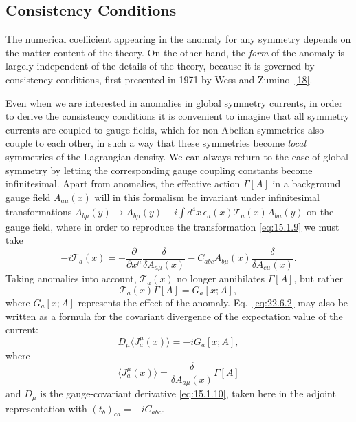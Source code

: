 \subsection{Consistency Conditions}
\label{sec:22.6}

The numerical coefficient appearing in the anomaly for any symmetry
depends on the matter content of the theory. On the other hand, the
\emph{form} of the anomaly is largely independent of the details of the
theory, because it is governed by consistency conditions, first presented
in 1971 by Wess and Zumino~\hyperref[ch22-ref-18]{[18]}.

Even when we are interested in anomalies in global symmetry currents, in
order to derive the consistency conditions it is convenient to imagine
that all symmetry currents are coupled to gauge fields, which for
non-Abelian symmetries also couple to each other, in such a way that these
symmetries become \emph{local} symmetries of the Lagrangian density. We can
always return to the case of global symmetry by letting the corresponding
gauge coupling constants become infinitesimal. Apart from anomalies, the
effective action $\Gamma[A]$ in a background gauge field
$A_{a\mu}(x)$ will in this formalism be invariant under infinitesimal
transformations
$A_{b\mu}(y)\rightarrow A_{b\mu}(y)
+i\int d^4x\,\epsilon_a(x)\mathcal T_a(x)A_{b\mu}(y)$
on the gauge field, where in order to reproduce the transformation
\eqref{eq:15.1.9} we must take
\begin{equation}
 -i\mathcal T_a(x)
 =-\frac{\partial}{\partial x^\mu}
 \frac{\delta}{\delta A_{a\mu}(x)}
 -C_{abc}A_{b\mu}(x)
 \frac{\delta}{\delta A_{c\mu}(x)}.
 \tag{22.6.1}\label{eq:22.6.1}
\end{equation}
Taking anomalies into account, $\mathcal T_a(x)$ no longer annihilates
$\Gamma[A]$, but rather
\begin{equation}
 \mathcal T_a(x)\Gamma[A]=G_a[x;A],
 \tag{22.6.2}\label{eq:22.6.2}
\end{equation}
where $G_a[x;A]$ represents the effect of the anomaly.
Eq.~\eqref{eq:22.6.2} may also be written as a formula for the covariant
divergence of the expectation value of the current:
\begin{equation}
 D_\mu\langle J^\mu_a(x)\rangle=-iG_a[x;A],
 \tag{22.6.3}\label{eq:22.6.3}
\end{equation}
where
\begin{equation}
 \langle J^\mu_a(x)\rangle
 =\frac{\delta}{\delta A_{a\mu}(x)}\Gamma[A]
 \tag{22.6.4}\label{eq:22.6.4}
\end{equation}
and $D_\mu$ is the gauge-covariant derivative \eqref{eq:15.1.10}, taken
here in the adjoint representation with
$(t_b)_{ca}=-iC_{abc}$.

